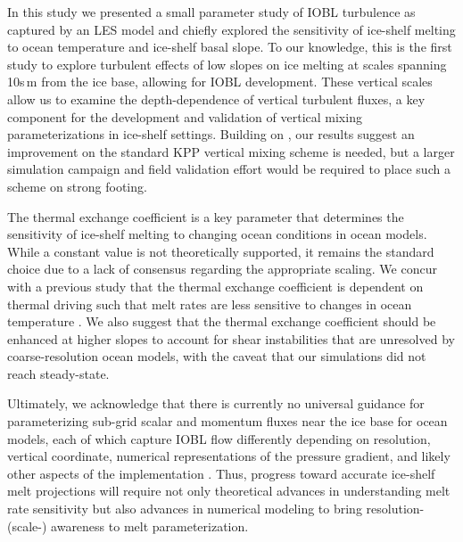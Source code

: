 \documentclass[tc, manuscript]{copernicus}
\begin{document}
\conclusions

In this study we presented a small parameter study of IOBL turbulence as captured by an LES model and chiefly explored the sensitivity of ice-shelf melting to ocean temperature and ice-shelf basal slope. To our knowledge, this is the first study to explore turbulent effects of low slopes on ice melting at scales spanning 10s\,\unit{m} from the ice base, allowing for IOBL development. These vertical scales allow us to examine the depth-dependence of vertical turbulent fluxes, a key component for the development and validation of vertical mixing parameterizations in ice-shelf settings. Building on \citet{jenkins_shear_2021}, our results suggest an improvement on the standard KPP vertical mixing scheme is needed, but a larger simulation campaign and field validation effort would be required to place such a scheme on strong footing. 

The thermal exchange coefficient is a key parameter that determines the sensitivity of ice-shelf melting to changing ocean conditions in ocean models. While a constant value is not theoretically supported, it remains the standard choice due to a lack of consensus regarding the appropriate scaling. We concur with a previous study that the thermal exchange coefficient is dependent on thermal driving such that melt rates are less sensitive to changes in ocean temperature \citep{vreugdenhil_stratification_2019}. We also suggest that the thermal exchange coefficient should be enhanced at higher slopes to account for shear instabilities that are unresolved by coarse-resolution ocean models, with the caveat that our simulations did not reach steady-state. 

Ultimately, we acknowledge that there is currently no universal guidance for parameterizing sub-grid scalar and momentum fluxes near the ice base for ocean models, each of which capture IOBL flow differently depending on resolution, vertical coordinate, numerical representations of the pressure gradient, and likely other aspects of the implementation \citep{gwyther_cold_2020}. Thus, progress toward accurate ice-shelf melt projections will require not only theoretical advances in understanding melt rate sensitivity but also advances in numerical modeling to bring resolution- (scale-) awareness to melt parameterization.

\end{document}

